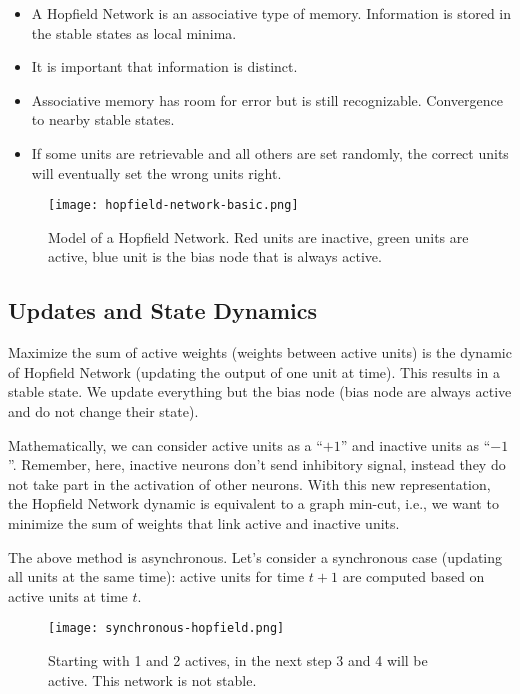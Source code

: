 \documentclass[main]{subfiles}
\begin{document}
\begin{itemize}[noitemsep,nolistsep]
	\item A Hopfield Network is an associative type of memory. Information is stored in the stable states as local minima.
	\item It is important that information is distinct.
	\item Associative memory has room for error but is still recognizable. Convergence to nearby stable states.
	\item If some units are retrievable and all others are set randomly, the correct units will eventually set the wrong units right.
\end{itemize}

\begin{figure}[H]
	\centering
	\texttt{[image: hopfield-network-basic.png]}
	\caption{Model of a Hopfield Network. Red units are inactive, green units are active, blue unit is the bias node that is always active.}
\end{figure}

\subsection{Updates and State Dynamics}

Maximize the sum of active weights (weights between active units) is the dynamic of Hopfield Network (updating the output of one unit at time). This results in a stable state. We update everything but the bias node (bias node are always active and do not change their state).

Mathematically, we can consider active units as a ``$+1$'' and inactive units as ``$-1$''.
Remember, here, inactive neurons don't send inhibitory signal, instead they do not take part in the activation of other neurons.
With this new representation, the Hopfield Network dynamic is equivalent to a graph min-cut, i.e., we want to minimize the sum of weights that link active and inactive units.

The above method is asynchronous.
Let's consider a synchronous case (updating all units at the same time): active units for time $t+1$ are computed based on active units at time $t$.

\begin{figure}[H]
	\centering
	\texttt{[image: synchronous-hopfield.png]}
	\caption{Starting with 1 and 2 actives, in the next step 3 and 4 will be active. This network is not stable.}
\end{figure}
\end{document}
